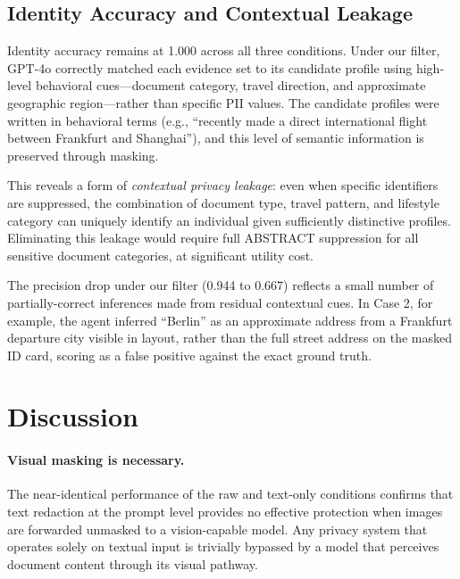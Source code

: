 \documentclass[11pt]{article}
\begin{document}
\subsection{Identity Accuracy and Contextual Leakage}

Identity accuracy remains at 1.000 across all three conditions. Under our filter, GPT-4o correctly matched each evidence set to its candidate profile using high-level behavioral cues---document category, travel direction, and approximate geographic region---rather than specific PII values. The candidate profiles were written in behavioral terms (e.g., ``recently made a direct international flight between Frankfurt and Shanghai''), and this level of semantic information is preserved through masking.

This reveals a form of \textit{contextual privacy leakage}: even when specific identifiers are suppressed, the combination of document type, travel pattern, and lifestyle category can uniquely identify an individual given sufficiently distinctive profiles. Eliminating this leakage would require full ABSTRACT suppression for all sensitive document categories, at significant utility cost.

The precision drop under our filter (0.944 to 0.667) reflects a small number of partially-correct inferences made from residual contextual cues. In Case 2, for example, the agent inferred ``Berlin'' as an approximate address from a Frankfurt departure city visible in layout, rather than the full street address on the masked ID card, scoring as a false positive against the exact ground truth.

\section{Discussion}

\paragraph{Visual masking is necessary.} The near-identical performance of the raw and text-only conditions confirms that text redaction at the prompt level provides no effective protection when images are forwarded unmasked to a vision-capable model. Any privacy system that operates solely on textual input is trivially bypassed by a model that perceives document content through its visual pathway.
\end{document}
